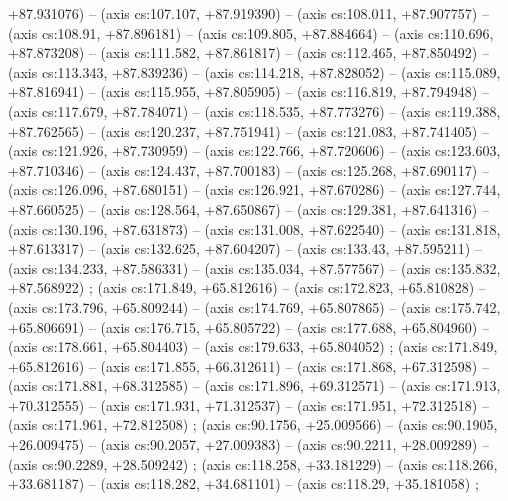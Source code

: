  +87.931076) --  (axis cs:107.107,    +87.919390) --  (axis cs:108.011,    +87.907757) --  (axis cs:108.91,    +87.896181) --  (axis cs:109.805,    +87.884664) --  (axis cs:110.696,    +87.873208) --  (axis cs:111.582,    +87.861817) --  (axis cs:112.465,    +87.850492) --  (axis cs:113.343,    +87.839236) --  (axis cs:114.218,    +87.828052) --  (axis cs:115.089,    +87.816941) --  (axis cs:115.955,    +87.805905) --  (axis cs:116.819,    +87.794948) --  (axis cs:117.679,    +87.784071) --  (axis cs:118.535,    +87.773276) --  (axis cs:119.388,    +87.762565) --  (axis cs:120.237,    +87.751941) --  (axis cs:121.083,    +87.741405) --  (axis cs:121.926,    +87.730959) --  (axis cs:122.766,    +87.720606) --  (axis cs:123.603,    +87.710346) --  (axis cs:124.437,    +87.700183) --  (axis cs:125.268,    +87.690117) --  (axis cs:126.096,    +87.680151) --  (axis cs:126.921,    +87.670286) --  (axis cs:127.744,    +87.660525) --  (axis cs:128.564,    +87.650867) --  (axis cs:129.381,    +87.641316) --  (axis cs:130.196,    +87.631873) --  (axis cs:131.008,    +87.622540) --  (axis cs:131.818,    +87.613317) --  (axis cs:132.625,    +87.604207) --  (axis cs:133.43,    +87.595211) --  (axis cs:134.233,    +87.586331) --  (axis cs:135.034,    +87.577567) --  (axis cs:135.832,    +87.568922) ;
    (axis cs:171.849,    +65.812616) --  (axis cs:172.823,    +65.810828) --  (axis cs:173.796,    +65.809244) --  (axis cs:174.769,    +65.807865) --  (axis cs:175.742,    +65.806691) --  (axis cs:176.715,    +65.805722) --  (axis cs:177.688,    +65.804960) --  (axis cs:178.661,    +65.804403) --  (axis cs:179.633,    +65.804052) ;
    (axis cs:171.849,    +65.812616) --  (axis cs:171.855,    +66.312611) --  (axis cs:171.868,    +67.312598) --  (axis cs:171.881,    +68.312585) --  (axis cs:171.896,    +69.312571) --  (axis cs:171.913,    +70.312555) --  (axis cs:171.931,    +71.312537) --  (axis cs:171.951,    +72.312518) --  (axis cs:171.961,    +72.812508) ;
    (axis cs:90.1756,    +25.009566) --  (axis cs:90.1905,    +26.009475) --  (axis cs:90.2057,    +27.009383) --  (axis cs:90.2211,    +28.009289) --  (axis cs:90.2289,    +28.509242) ;
    (axis cs:118.258,    +33.181229) --  (axis cs:118.266,    +33.681187) --  (axis cs:118.282,    +34.681101) --  (axis cs:118.29,    +35.181058) ;
